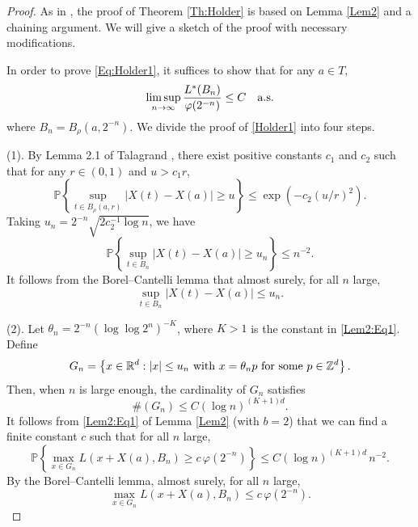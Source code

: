 \documentclass[11pt, reqno]{amsart}
\def\R{{\mathbb R}}
\def\Z{{\mathbb Z}}
\def\P{{\mathbb P}}
\numberwithin{equation}{section}
\begin{document}
\begin{proof}
As in \cite{E81, X97}, the proof of Theorem \ref{Th:Holder} is based on Lemma \ref{Lem2} and a 
chaining argument. We will give a sketch of the proof with necessary modifications.

In order to prove \eqref{Eq:Holder1}, it suffices to show that for any $a \in T$, 
\begin{equation}\label{Holder1}
\limsup_{n \to \infty} \frac{L^*(B_n)}{\varphi(2^{-n})} \le C \quad \textup{a.s.}
\end{equation}
where $B_n = B_\rho(a, 2^{-n})$.
We divide the proof of \eqref{Holder1} into four steps.

(1). By Lemma 2.1 of Talagrand \cite{T95}, there exist positive constants $c_1$ and $c_2$ such that 
for any $r \in (0, 1)$ and $u > c_1 r$,
\[ \P\left\{ \sup_{t \in B_\rho(a, r)} |X(t) - X(a)| \ge u \right\} \le \exp\left(- c_2 (u/r)^2\right). \]
Taking $u_n = 2^{-n}\sqrt{2c_2^{-1} \log n}$, we have
\[ \P\left\{ \sup_{t \in B_n} |X(t) - X(a)| \ge u_n \right\} \le n^{-2}. \]
It follows from the Borel--Cantelli lemma that almost surely, for all $n$ large,
\begin{equation}\label{ineq:X}
\sup_{t \in B_n} |X(t) - X(a)| \le u_n.
\end{equation}

(2). Let $\theta_n = 2^{-n}(\log\log 2^n)^{-K}$, where $K > 1$ is the constant in \eqref{Lem2:Eq1}. Define
\begin{equation*}
G_n = \left\{ x \in \R^d : |x| \le  u_n \textup{ with } x = \theta_n p \textup{ for some } p \in \Z^d \right\}.
\end{equation*}
Then, when $n$ is large enough, the cardinality of $G_n$ satisfies
\[ \# (G_n) \le C (\log n)^{(K+1)d}. \]
It follows from \eqref{Lem2:Eq1} of Lemma \ref{Lem2} (with $b = 2$) that we can find a finite constant $c$ 
such that for all $n$ large, 
\[ \P\left\{ \max_{x \in G_n} L(x + X(a), B_n) \ge c\, \varphi(2^{-n}) \right\} \le C(\log n)^{(K+1)d}\, n^{-2}. \]
By the Borel--Cantelli lemma, almost surely, for all $n$ large, 
\begin{equation}\label{max_LT}
\max_{x \in G_n} L(x + X(a), B_n) \le c\, \varphi(2^{-n}).
\end{equation}


\end{proof}
\end{document}
